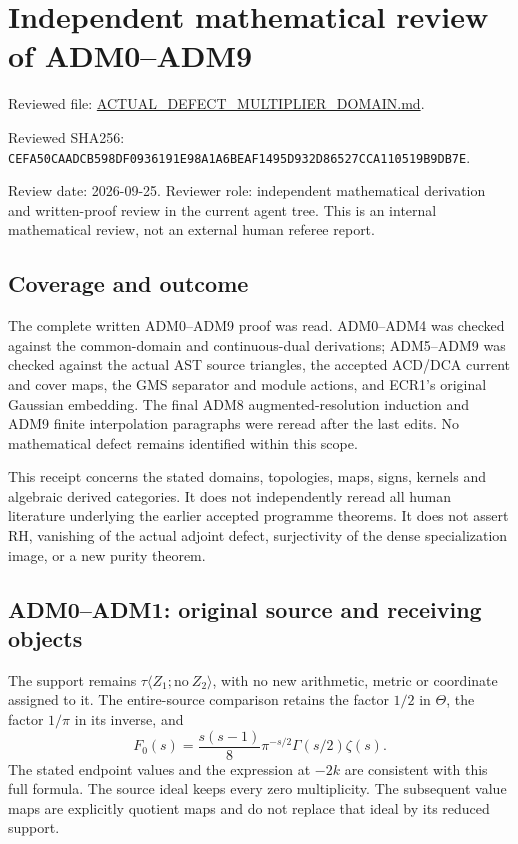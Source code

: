 \section{Independent mathematical review of
ADM0--ADM9}\label{independent-mathematical-review-of-adm0adm9}

Reviewed file:
\href{https://github.com/KokunoYumeto/zeta-function-research-reader/blob/main/workbenches/splitzero-tandem/continuations/20260925-full-source-tensor-and-original-divisor/identity/ACTUAL_DEFECT_MULTIPLIER_DOMAIN.md}{ACTUAL\_DEFECT\_MULTIPLIER\_DOMAIN.md}.

Reviewed SHA256:
\texttt{CEFA50CAADCB598DF0936191E98A1A6BEAF1495D932D86527CCA110519B9DB7E}.

Review date: 2026-09-25. Reviewer role: independent mathematical
derivation and written-proof review in the current agent tree. This is
an internal mathematical review, not an external human referee report.

\subsection{Coverage and outcome}\label{coverage-and-outcome}

The complete written ADM0--ADM9 proof was read. ADM0--ADM4 was checked
against the common-domain and continuous-dual derivations; ADM5--ADM9
was checked against the actual AST source triangles, the accepted
ACD/DCA current and cover maps, the GMS separator and module actions,
and ECR1's original Gaussian embedding. The final ADM8
augmented-resolution induction and ADM9 finite interpolation paragraphs
were reread after the last edits. No mathematical defect remains
identified within this scope.

This receipt concerns the stated domains, topologies, maps, signs,
kernels and algebraic derived categories. It does not independently
reread all human literature underlying the earlier accepted programme
theorems. It does not assert RH, vanishing of the actual adjoint defect,
surjectivity of the dense specialization image, or a new purity theorem.

\subsection{ADM0--ADM1: original source and receiving
objects}\label{adm0adm1-original-source-and-receiving-objects}

The support remains \(\tau\langle Z_1;\mathrm{no}\ Z_2\rangle\), with no
new arithmetic, metric or coordinate assigned to it. The entire-source
comparison retains the factor \(1/2\) in \(\Theta\), the factor
\(1/\pi\) in its inverse, and \[
F_0(s)=\frac{s(s-1)}8\pi^{-s/2}\Gamma(s/2)\zeta(s).
\] The stated endpoint values and the expression at \(-2k\) are
consistent with this full formula. The source ideal keeps every zero
multiplicity. The subsequent value maps are explicitly quotient maps and
do not replace that ideal by its reduced support.

